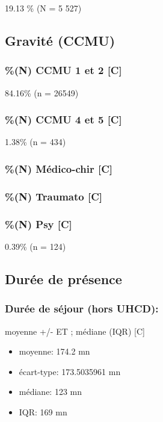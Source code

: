 \documentclass[]{article}
\begin{document}
19.13 \% (N = 5 527)

\subsection{Gravité (CCMU)}\label{gravite-ccmu}

\subsubsection{\%(N) CCMU 1 et 2 {[}C{]}}\label{n-ccmu-1-et-2-c}

84.16\% (n = 26549)

\subsubsection{\%(N) CCMU 4 et 5 {[}C{]}}\label{n-ccmu-4-et-5-c}

1.38\% (n = 434)

\subsubsection{\%(N) Médico-chir {[}C{]}}\label{n-medico-chir-c}

\subsubsection{\%(N) Traumato {[}C{]}}\label{n-traumato-c}

\subsubsection{\%(N) Psy {[}C{]}}\label{n-psy-c}

0.39\% (n = 124)

\subsection{Durée de présence}\label{duree-de-presence}

\subsubsection{Durée de séjour (hors
UHCD):}\label{duree-de-sejour-hors-uhcd}

moyenne +/- ET ; médiane (IQR) {[}C{]}

\begin{itemize}
\itemsep1pt\parskip0pt
\item
  moyenne: 174.2 mn
\item
  écart-type: 173.5035961 mn
\item
  médiane: 123 mn
\item
  IQR: 169 mn
\end{itemize}
\end{document}
